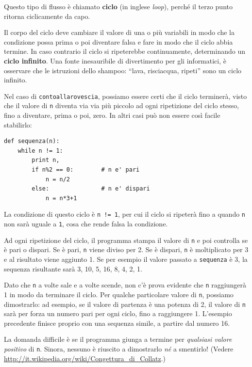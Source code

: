 \documentclass[10pt]{book}
\begin{document}
Questo tipo di flusso è chiamato {\bf ciclo } (in inglese {\em loop}), perché il terzo punto ritorna ciclicamente da capo. 

Il corpo del ciclo deve cambiare il valore di una o più variabili in modo che la condizione possa prima o poi diventare falsa e fare in modo che il ciclo abbia termine. In caso contrario il ciclo si ripeterebbe continuamente, determinando un {\bf ciclo infinito}. Una fonte inesauribile di divertimento per gli informatici, è osservare che le istruzioni dello shampoo:
``lava, risciacqua, ripeti'' sono un ciclo infinito.


Nel caso di {\tt contoallarovescia}, possiamo essere certi che il ciclo terminerà, visto che il valore di {\tt n} diventa via via più piccolo ad ogni ripetizione del ciclo stesso, fino a diventare, prima o poi, zero. In altri casi può non essere così facile stabilirlo:

\begin{verbatim}
def sequenza(n):
    while n != 1:
        print n,
        if n%2 == 0:        # n e' pari
            n = n/2
        else:               # n e' dispari
            n = n*3+1
\end{verbatim}
%
La condizione di questo ciclo è {\tt n != 1}, per cui il ciclo si ripeterà
fino a quando {\tt n} non sarà uguale a {\tt 1}, cosa che rende falsa la condizione.

Ad ogni ripetizione del ciclo, il programma stampa il valore di {\tt n} e poi controlla se è pari o dispari. Se è pari, {\tt n} viene diviso per 2. Se è dispari, {\tt n} è moltiplicato per 3 e al risultato viene aggiunto 1. Se per esempio il valore passato a {\tt sequenza} è 3, la sequenza risultante sarà 3, 10, 5, 16, 8, 4, 2, 1.

Dato che {\tt n} a volte sale e a volte scende, non c'è prova evidente che {\tt n} raggiungerà 1 in modo da terminare il ciclo. Per qualche particolare valore di {\tt n}, possiamo dimostrarlo: ad esempio, se il valore di partenza è una potenza di 2, il valore di {\tt n} sarà per forza un numero pari per ogni ciclo, fino a raggiungere 1. L'esempio precedente finisce proprio con una sequenza simile, a partire dal numero 16.

La domanda difficile è se il programma giunga a termine per {\em qualsiasi valore positivo} di {\tt n}. Sinora, nessuno è riuscito a dimostrarlo {\em né} a smentirlo!  (Vedere \url{http://it.wikipedia.org/wiki/Congettura_di_Collatz}.)
\end{document}
